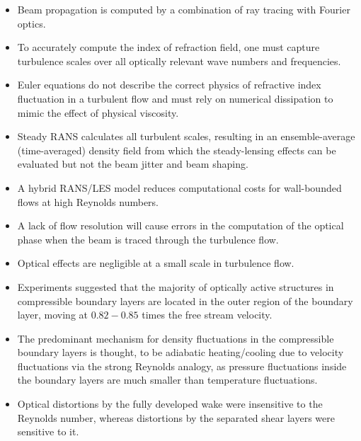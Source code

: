\begin{itemize}
            \item Beam propagation is computed by a combination of ray tracing with Fourier optics.
            \item To accurately compute the index of refraction field, one must capture turbulence scales over all optically relevant wave numbers and frequencies. 
            \item Euler equations do not describe the correct physics of refractive index fluctuation in a turbulent flow and must rely on numerical dissipation to mimic the effect of physical viscosity. 
            \item Steady RANS calculates all turbulent scales, resulting in an ensemble-average (time-averaged) density field from which the steady-lensing effects can be evaluated but not the beam jitter and beam shaping.      
            \item A hybrid RANS/LES model reduces computational costs for wall-bounded flows at high Reynolds numbers.
            \item A lack of flow resolution will cause errors in the computation of the optical phase when the beam is traced through the turbulence flow.
            \item Optical effects are negligible at a small scale in turbulence flow. 
            \item Experiments suggested that the majority of optically active structures in compressible boundary layers are located in the outer region of the boundary layer, moving at $0.82 - 0.85$ times the free stream velocity.  
            \item The predominant mechanism for density fluctuations in the compressible boundary layers is thought, to be adiabatic heating/cooling due to velocity fluctuations via the strong Reynolds analogy, as pressure fluctuations inside the boundary layers are much smaller than temperature fluctuations. 
            \item Optical distortions by the fully developed wake were insensitive to the Reynolds number, whereas distortions by the separated shear layers were sensitive to it.
        \end{itemize}


